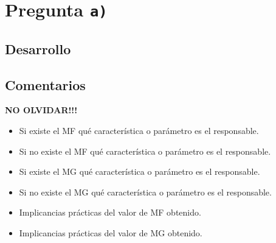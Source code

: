 \section{Pregunta \texttt{a)}}\label{pregunta-a}


\subsection{Desarrollo}


\FloatBarrier
\subsection{Comentarios}

\textbf{NO OLVIDAR!!!}

\begin{itemize}
  \item Si existe el MF qué característica o parámetro es el responsable.
  \item Si no existe el MF qué característica o parámetro es el responsable.
  \item Si existe el MG qué característica o parámetro es el responsable.
  \item Si no existe el MG qué característica o parámetro es el responsable.
  \item Implicancias prácticas del valor de MF obtenido.
  \item Implicancias prácticas del valor de MG obtenido.
\end{itemize}



